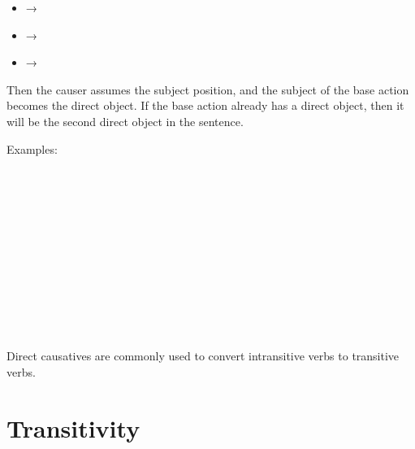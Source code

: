 \documentclass{book}
\begin{document}
\begin{itemize}
  \item {} → 
  \item {} → 
  \item {} → 
\end{itemize}

Then the causer assumes the subject position, and the subject of the base action becomes the direct object. If the base action already has a direct object, then it will be the second direct object in the sentence.

Examples: \\
~\\
  \\
  \\
  \\
~\\
    \\
    \\
     \\
~\\
     \\
     \\
     \\

Direct causatives are commonly used to convert intransitive verbs to transitive verbs.

\section{Transitivity}
\end{document}
